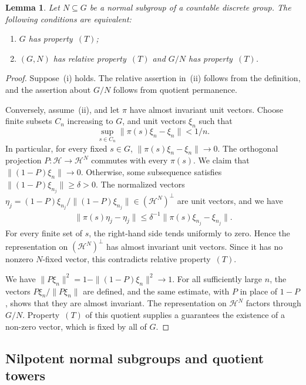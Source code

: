 \documentclass[11pt,a4paper]{article}
\newtheorem{lemma}[theorem]{Lemma}
\theoremstyle{definition}
\newcommand{\HH}{\mathcal H}
\newcommand{\rt}{(T)}
\begin{document}
\begin{lemma}
\label{lem:normalextension}
Let \(N\subseteq G\) be a normal subgroup of a countable
discrete group. The following conditions are equivalent:
\begin{enumerate}[label=\textup{(\roman*)},beginpenalty=10000,midpenalty=10000]
 \item \(G\) has property~\(\rt\);
 \item \((G,N)\) has relative property~\(\rt\) and \(G/N\)
 has property~\(\rt\).
\end{enumerate}
\end{lemma}
\begin{proof}
Suppose~(i) holds. The relative assertion in~(ii) follows
from the definition, and the assertion about \(G/N\) follows
from quotient permanence.

Conversely, assume~(ii), and let \(\pi\) have almost invariant unit vectors.
Choose finite subsets \(C_n\) increasing to \(G\), and unit
vectors \(\xi_n\) such that
\[
 \sup_{s\in C_n}\|\pi(s)\xi_n-\xi_n\|<1/n.
\]
In particular, for every fixed \(s\in G\),
\(\|\pi(s)\xi_n-\xi_n\|\to0\).
The orthogonal projection
\(P:\HH\to\HH^N\) commutes with every \(\pi(s)\).
We claim that \(\|(1-P)\xi_n\|\to0\).
Otherwise, some subsequence satisfies
\(\|(1-P)\xi_{n_j}\|\ge\delta>0\).
The  normalized vectors \( \eta_j=(1-P)\xi_{n_j}/\|(1-P)\xi_{n_j}\| \in(\HH^N)^\perp \)
are unit vectors, and we have
\[
 \begin{aligned}
 \|\pi(s)\eta_j-\eta_j\| \le\delta^{-1}\|\pi(s)\xi_{n_j}-\xi_{n_j}\|.
 \end{aligned}
\]
For every finite set of \(s\), the right-hand side tends
uniformly to zero. Hence the representation on
\((\HH^N)^\perp\) has almost invariant unit vectors.
Since it has no nonzero \(N\)-fixed vector, this contradicts
relative property~\(\rt\).

We have  \(\|P\xi_n\|^2=1-\|(1-P)\xi_n\|^2\to1\).
For all sufficiently large \(n\), the vectors
\(P\xi_n/\|P\xi_n\|\) are defined, and the same estimate,
with \(P\) in place of \(1-P\), shows that they are almost
invariant. The representation on \(\HH^N\) factors through
\(G/N\). Property~\(\rt\) of this quotient supplies a
guarantees the existence of a non-zero vector, which is fixed by all of \(G\).
\end{proof}

\subsection{Nilpotent normal subgroups and quotient towers}
\end{document}
